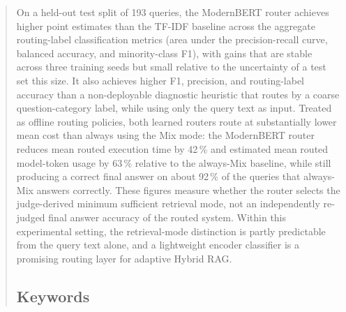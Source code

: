 \documentclass[english, bibtex]{kththesis}               %
\numberwithin{listing}{chapter}
\begin{document}
\begin{abstract}
\begin{scontents}[store-env=abstracts,print-env=true]
On a held-out test split of 193 queries, the ModernBERT router achieves higher point estimates than the TF-IDF baseline across the aggregate routing-label classification metrics (area under the precision-recall curve, balanced accuracy, and minority-class F1), with gains that are stable across three training seeds but small relative to the uncertainty of a test set this size. It also achieves higher F1, precision, and routing-label accuracy than a non-deployable diagnostic heuristic that routes by a coarse question-category label, while using only the query text as input. Treated as offline routing policies, both learned routers route at substantially lower mean cost than always using the Mix mode: the ModernBERT router reduces mean routed execution time by 42\,\% and estimated mean routed model-token usage by 63\,\% relative to the always-Mix baseline, while still producing a correct final answer on about 92\,\% of the queries that always-Mix answers correctly. These figures measure whether the router selects the judge-derived minimum sufficient retrieval mode, not an independently re-judged final answer accuracy of the routed system. Within this experimental setting, the retrieval-mode distinction is partly predictable from the query text alone, and a lightweight encoder classifier is a promising routing layer for adaptive Hybrid RAG.
\end{scontents}

\subsection*{Keywords}
\begin{scontents}[store-env=keywords,print-env=true]
\end{scontents}
\end{abstract}
\cleardoublepage
{}
\end{document}
